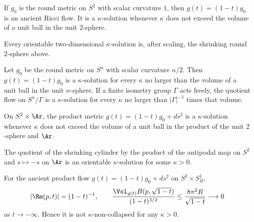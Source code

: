 \begin{example}\label{ex:shrinking-sphere-kappa-solution}
If $g_0$ is the round metric on $S^2$ with scalar curvature $1$, then
$g(t)=(1-t)g_0$ is an ancient Ricci flow. It is a $\kappa$-solution
whenever $\kappa$ does not exceed the volume of a unit ball in the
unit $2$-sphere.
\end{example}

\begin{theorem}\label{thm:two-dimensional-kappa-solution-preview}
Every orientable two-dimensional $\kappa$-solution is, after scaling,
the shrinking round $2$-sphere above.
\end{theorem}

\begin{example}\label{ex:round-sphere-quotient-kappa-solution}
Let $g_0$ be the round metric on $S^n$ with scalar curvature $n/2$.
Then $g(t)=(1-t)g_0$ is a $\kappa$-solution for every $\kappa$ no
larger than the volume of a unit ball in the unit $n$-sphere. If a
finite isometry group $\Gamma$ acts freely, the quotient flow on
$S^n/\Gamma$ is a $\kappa$-solution for every $\kappa$ no larger than
$|\Gamma|^{-1}$ times that volume.
\end{example}

\begin{example}\label{ex:cylinder-kappa-solution}
On $S^2\times\Ar$, the product metric
$g(t)=(1-t)g_0+ds^2$ is a $\kappa$-solution whenever $\kappa$ does
not exceed the volume of a unit ball in the product of the unit
$2$-sphere and $\Ar$.
\end{example}

\begin{example}\label{ex:cylinder-quotient-kappa-solution}
The quotient of the shrinking cylinder by the product of the
antipodal map on $S^2$ and $s\mapsto-s$ on $\Ar$ is an orientable
$\kappa$-solution for some $\kappa>0$.
\end{example}

\begin{example}\label{ex:cylinder-with-circle-not-kappa-noncollapsed}
For the ancient product flow
$g(t)=(1-t)g_0+ds^2$ on $S^2\times S^1_R$,
\[
 |\Rm(p,t)|=(1-t)^{-1},\qquad
 \frac{\Vol_{g(t)}B(p,\sqrt{1-t})}{(1-t)^{3/2}}
 \leq\frac{8\pi^2R}{\sqrt{1-t}}\longrightarrow0
\]
as $t\to-\infty$. Hence it is not $\kappa$-non-collapsed for any
$\kappa>0$.
\end{example}

